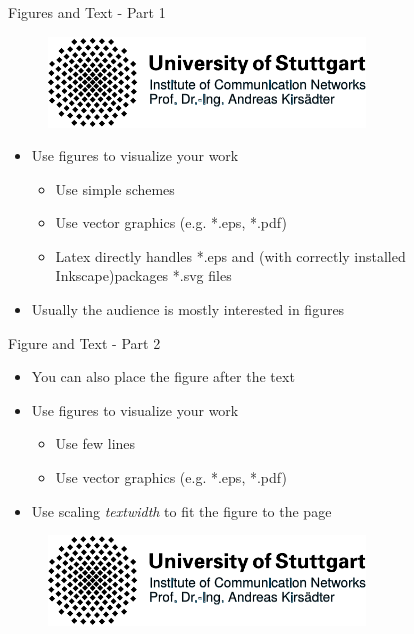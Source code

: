 \documentclass[english,american,german,aspectratio=43]{beamer}
\begin{document}
\begin{frame}{Figures and Text - Part 1 }

  \begin{figure}

    \begin{centering}
      \includegraphics[width=0.75\textwidth]{img/logo_vector_example}
      \par
    \end{centering}
  \end{figure}
  \medskip{}

  \begin{itemize}
    \item Use figures to visualize your work

      \begin{itemize}
        \item Use simple schemes
        \item Use vector graphics (e.g. {*}.eps, {*}.pdf)
        \item Latex directly handles {*}.eps and (with correctly
          installed Inkscape)packages
          {*}.svg files
      \end{itemize}
    \item Usually the audience is mostly interested in figures
  \end{itemize}
\end{frame}

\begin{frame}{Figure and Text - Part 2}

  \begin{itemize}
    \item You can also place the figure after the text
    \item Use figures to visualize your work

      \begin{itemize}
        \item Use few lines
        \item Use vector graphics (e.g. {*}.eps, {*}.pdf)
      \end{itemize}
    \item Use scaling \textit{textwidth }to fit the figure to the page\medskip{}
  \end{itemize}
  \begin{figure}
    \centering{}\includegraphics[width=0.75\textwidth]{img/logo_vector_example}
  \end{figure}

\end{frame}
\end{document}
